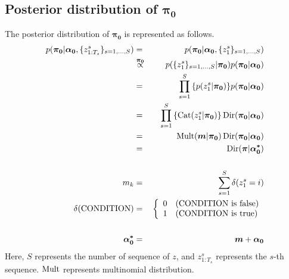 \documentclass[a4paper]{article}
\DeclareMathOperator{\Cat}{\rm Cat}
\DeclareMathOperator{\Mult}{\rm Mult}
\DeclareMathOperator{\Dir}{\rm Dir}
\newcommand{\proptoas}[1]{\overset{#1}{\propto}}
\begin{document}
	\subsection{Posterior distribution of $\boldsymbol{\pi_0}$}
	The posterior distribution of $\boldsymbol{\pi_0}$ is represented as follows.
	\begin{eqnarray}
		p(\boldsymbol{\pi_0} | \boldsymbol{\alpha_0}, \{z_{1:T_s}^{s}\}_{s=1,\ldots,S})
		&=&
		p(\boldsymbol{\pi_0} | \boldsymbol{\alpha_0}, \{z_{1}^{s}\}_{s=1,\ldots,S}) \\
		&\proptoas{\boldsymbol{\pi_0}}&
		p(\{z_{1}^{s}\}_{s=1,\ldots,S} | \boldsymbol{\pi_0}) p(\boldsymbol{\pi_0} | \boldsymbol{\alpha_0})\\
		&=&
		\prod_{s=1}^{S}{\left\{ p(z^{s}_{1} | \boldsymbol{\pi_0}) \right\} } p(\boldsymbol{\pi_0} | \boldsymbol{\alpha_0})\\
		&=&
		\prod_{s=1}^{S}{\left\{ \Cat(z^{s}_{1} | \boldsymbol{\pi_0}) \right\} } \Dir(\boldsymbol{\pi_0} | \boldsymbol{\alpha_0})\\
		&=&
		\Mult(\boldsymbol{m} | \boldsymbol{\pi_0}) \Dir(\boldsymbol{\pi_0} | \boldsymbol{\alpha_0})\\
		&=&
		\Dir(\boldsymbol{\pi} | \boldsymbol{\alpha^*_0})\\
		\nonumber \\
		m_k &=& \sum_{s=1}^{S}{\delta(z^s_1 = i)}\\
		\delta(\text{CONDITION})
		&=&
		\left\{
		\begin{array}{ll}
			0 & (\text{CONDITION is false})\\
			1 & (\text{CONDITION is true})
		\end{array}
		\right.\\
		\nonumber\\
		\boldsymbol{\alpha^*_0} &=& \boldsymbol{m} + \boldsymbol{\alpha_0}
	\end{eqnarray}
	Here, $S$ represents the number of sequence of $z$, and $z_{1:T_s}^{s}$ represents the $s$-th sequence.
	$\Mult$ represents multinomial distribution.
\end{document}
